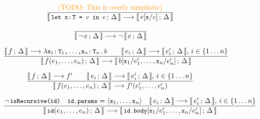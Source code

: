 
\begin{figure}[htb]\ContinuedFloat
\centering
\begin{framed}

\begin{equation}
\dfrac{
  \text{\TODO{This is overly simplistic}}
}{
  \lb{\stt{let x:\,T = $v$ in $e$}}{\Delta} \longrightarrow
  \lb{e[\stt{x}/\stt{$v$}]}{\Delta}
}
\end{equation}



\begin{equation}
\dfrac{
  \empty
}{
  \lb{\neg\, e}{\Delta} \longrightarrow \neg\,\lb{e}{\Delta}
}
\end{equation}

\begin{equation}
\dfrac{
  \llbracket\, f\,;\, \Delta\, \rrbracket \longrightarrow \lambda \texttt{\small{x$_1$:\,T$_1$,\ldots,x$_n$:\,T$_n$.\,$b$}}
  \qquad
  \llbracket\, e_i\,;\, \Delta\, \rrbracket \longrightarrow \llbracket\, e_i'\,;\, \Delta\, \rrbracket,\, i \in \{1 \ldots n\}
}{
  \llbracket\, f(e_1,\ldots,e_n)\,;\, \Delta\, \rrbracket \longrightarrow
  \llbracket\, b[\texttt{\small{x}}_1/e_1',\ldots,\texttt{\small{x}}_n/e_n']\,;\, \Delta\, \rrbracket
}
\end{equation}

\begin{equation}
\dfrac{
  \llbracket\, f\,;\, \Delta\, \rrbracket \longrightarrow f' \qquad
  \llbracket\, e_i\,;\, \Delta\, \rrbracket \longrightarrow \llbracket\, e_i'\,;\, \Delta\, \rrbracket,\, i \in \{1 \ldots n\}
}{
  \llbracket\, f(e_1,\ldots,e_n)\,;\, \Delta\, \rrbracket \longrightarrow
  f'(e_1', \ldots, e_n')
}
\end{equation}


\begin{equation}
\dfrac{
 \neg\,\texttt{\small{isRecursive(id)}} \quad
 \texttt{\small{id.params}} = \langle \texttt{\small{x}}_1, \ldots, \texttt{\small{x}}_n \rangle \quad
 \llbracket\, e_i\,;\, \Delta\, \rrbracket \longrightarrow \llbracket\, e_i'\,;\, \Delta\, \rrbracket,\, i \in \{1 \ldots n\}
}{
  \llbracket\, \texttt{\small{id}}(e_1,\ldots,e_n)\,;\, \Delta\, \rrbracket \longrightarrow
  \llbracket\, \texttt{\small{id.body}}[\texttt{\small{x}}_1/e_1',\ldots,\texttt{\small{x}}_n/e_n']\,;\, \Delta\, \rrbracket
}
\end{equation}


\end{framed}
\end{figure}
